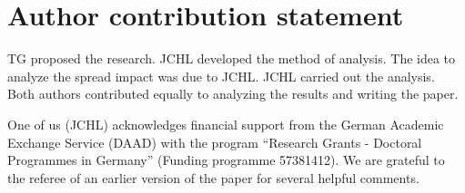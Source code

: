 \section{Author contribution statement}

TG proposed the research. JCHL developed the method of analysis. The idea to
analyze the spread impact was due to JCHL. JCHL carried out the analysis. Both
authors contributed equally to analyzing the results and writing the paper.

    One of us (JCHL) acknowledges financial support from the German Academic
    Exchange Service (DAAD) with the program ``Research Grants - Doctoral
    Programmes in Germany'' (Funding programme 57381412). We are grateful to
    the referee of an earlier version of the paper for several helpful
    comments.
